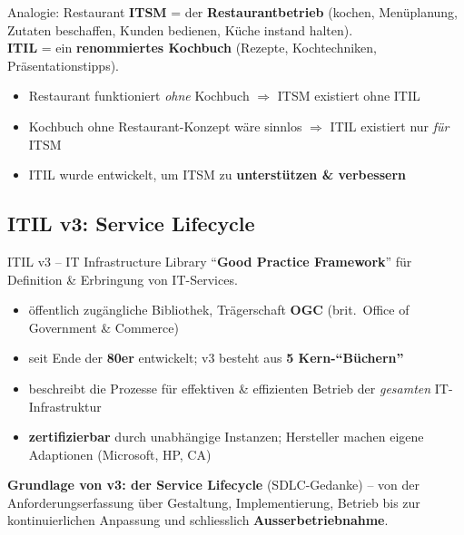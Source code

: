 \documentclass[a4paper, fontsize=7pt]{scrartcl}
\begin{document}
\begin{subbox}{Analogie: Restaurant}
\textbf{ITSM} = der \textbf{Restaurantbetrieb} (kochen, Menüplanung, Zutaten
beschaffen, Kunden bedienen, Küche instand halten).\\
\textbf{ITIL} = ein \textbf{renommiertes Kochbuch} (Rezepte, Kochtechniken,
Präsentationstipps).
\begin{itemize}
    \item Restaurant funktioniert \emph{ohne} Kochbuch $\Rightarrow$ ITSM
          existiert ohne ITIL
    \item Kochbuch ohne Restaurant-Konzept wäre sinnlos $\Rightarrow$ ITIL
          existiert nur \emph{für} ITSM
    \item ITIL wurde entwickelt, um ITSM zu \textbf{unterstützen \&
          verbessern}
\end{itemize}
\end{subbox}

\subsection{ITIL v3: Service Lifecycle}

\begin{mainbox}{ITIL v3 -- IT Infrastructure Library}
``\textbf{Good Practice Framework}'' für Definition \& Erbringung von
IT-Services.
\begin{itemize}
    \item öffentlich zugängliche Bibliothek, Trägerschaft \textbf{OGC}
          (brit.\ Office of Government \& Commerce)
    \item seit Ende der \textbf{80er} entwickelt; v3 besteht aus
          \textbf{5 Kern-``Büchern''}
    \item beschreibt die Prozesse für effektiven \& effizienten Betrieb der
          \emph{gesamten} IT-Infrastruktur
    \item \textbf{zertifizierbar} durch unabhängige Instanzen; Hersteller
          machen eigene Adaptionen (Microsoft, HP, CA)
\end{itemize}
\textbf{Grundlage von v3: der Service Lifecycle} (SDLC-Gedanke) -- von der
Anforderungserfassung über Gestaltung, Implementierung, Betrieb bis zur
kontinuierlichen Anpassung und schliesslich \textbf{Ausserbetriebnahme}.
\end{mainbox}
\end{document}
